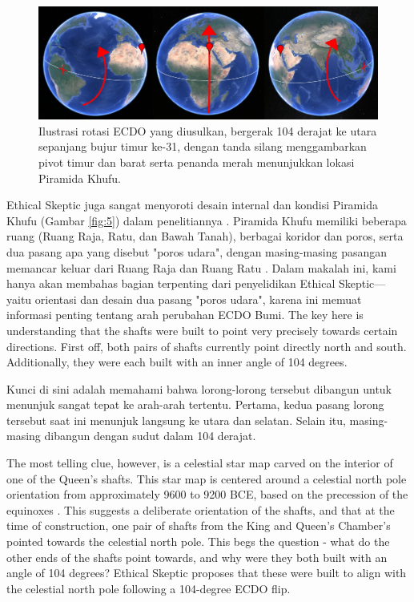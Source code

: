 \documentclass[10pt,twocolumn,letterpaper]{article}
\begin{document}
\begin{figure}[b]
\begin{center}
\includegraphics[width=1\textwidth]{drawing.jpg}
\end{center}
   \caption{Ilustrasi rotasi ECDO yang diusulkan, bergerak 104 derajat ke utara sepanjang bujur timur ke-31, dengan tanda silang menggambarkan pivot timur dan barat serta penanda merah menunjukkan lokasi Piramida Khufu.}
\label{fig:6}
\end{figure}

Ethical Skeptic juga sangat menyoroti desain internal dan kondisi Piramida Khufu (Gambar \ref{fig:5}) dalam penelitiannya \cite{28}. Piramida Khufu memiliki beberapa ruang (Ruang Raja, Ratu, dan Bawah Tanah), berbagai koridor dan poros, serta dua pasang apa yang disebut "poros udara", dengan masing-masing pasangan memancar keluar dari Ruang Raja dan Ruang Ratu \cite{29,30}. Dalam makalah ini, kami hanya akan membahas bagian terpenting dari penyelidikan Ethical Skeptic—yaitu orientasi dan desain dua pasang "poros udara", karena ini memuat informasi penting tentang arah perubahan ECDO Bumi.
The key here is understanding that the shafts were built to point very precisely towards certain directions. First off, both pairs of shafts currently point directly north and south. Additionally, they were each built with an inner angle of 104 degrees.

Kunci di sini adalah memahami bahwa lorong-lorong tersebut dibangun untuk menunjuk sangat tepat ke arah-arah tertentu. Pertama, kedua pasang lorong tersebut saat ini menunjuk langsung ke utara dan selatan. Selain itu, masing-masing dibangun dengan sudut dalam 104 derajat.

The most telling clue, however, is a celestial star map carved on the interior of one of the Queen's shafts. This star map is centered around a celestial north pole orientation from approximately 9600 to 9200 BCE, based on the precession of the equinoxes \cite{28}. This suggests a deliberate orientation of the shafts, and that at the time of construction, one pair of shafts from the King and Queen's Chamber's pointed towards the celestial north pole. This begs the question - what do the other ends of the shafts point towards, and why were they both built with an angle of 104 degrees? Ethical Skeptic proposes that these were built to align with the celestial north pole following a 104-degree ECDO flip.
\end{document}
